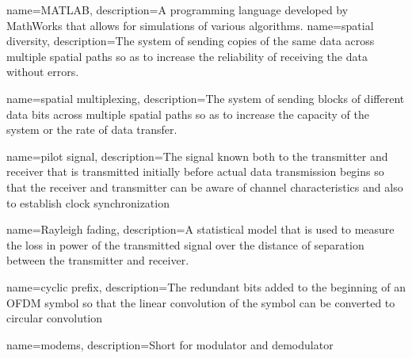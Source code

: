 {
    name=MATLAB,
    description={A programming language developed by MathWorks that allows for simulations of various algorithms.}
}
{
	name=spatial diversity,
	description={The system of sending copies of the same data across multiple spatial paths so as to increase the reliability of receiving the data without errors.}
}

{
	name=spatial multiplexing,
	description={The system of sending blocks of different data bits across multiple spatial paths so as to increase the capacity of the system or the rate of data transfer.}
}

{
	name=pilot signal,
	description={The signal known both to the transmitter and receiver that is transmitted initially before actual data transmission begins so that the receiver and transmitter can be aware of channel characteristics and also to establish clock synchronization}
}

{
	name=Rayleigh fading,
	description={A statistical model that is used to measure the loss in power of the transmitted signal over the distance of separation between the transmitter and receiver.}
}

{
	name=cyclic prefix,
	description={The redundant bits added to the beginning of an OFDM symbol so that the linear convolution of the symbol can be converted to circular convolution}
}

{
	name=modems,
	description={Short for modulator and demodulator}
}









